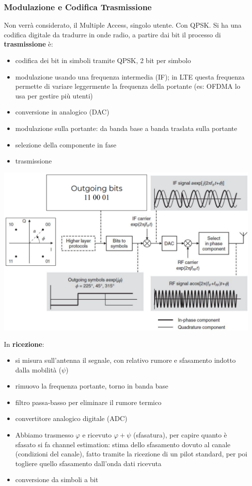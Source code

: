 \subsubsection{Modulazione e Codifica Trasmissione}

Non verrà considerato, il Multiple Access, singolo utente. Con QPSK. Si ha una codifica digitale da tradurre in onde radio, a partire dai bit il processo di \textbf{trasmissione} è:
\begin{itemize}
	\item codifica dei bit in simboli tramite QPSK, 2 bit per simbolo
	\item modulazione usando una frequenza intermedia (IF); in LTE questa frequenza permette di variare leggermente la frequenza della portante (es: OFDMA lo usa per gestire più utenti)
	\item conversione in analogico (DAC)
	\item modulazione sulla portante: da banda base a banda traslata sulla portante
	\item selezione della componente in fase 
	\item trasmissione
\end{itemize}
\begin{center}
	\includegraphics[width=0.9\linewidth]{img/4g/mightbesending}
\end{center}

In \textbf{ricezione}: 
\begin{itemize}
	\item si misura sull'antenna il segnale, con relativo rumore e sfasamento indotto dalla mobilità ($\psi$)
	\item rimuovo la frequenza portante, torno in banda base
	\item filtro passa-basso per eliminare il rumore termico
	\item convertitore analogico digitale (ADC)
	\item Abbiamo trasmesso $\varphi$ e ricevuto $\varphi + \psi$ (sfasatura), per capire quanto è sfasato si fa channel estimation: stima dello sfasamento dovuto al canale (condizioni del canale), fatto tramite la ricezione di un pilot standard, per poi togliere quello sfasamento dall'onda dati ricevuta
	\item conversione da simboli a bit
\end{itemize}

